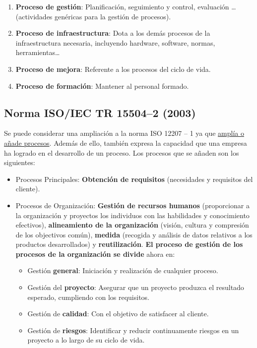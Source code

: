 \begin{enumerate}
    \item \textbf{Proceso de gestión}: Planificación, seguimiento y control, evaluación \ldots (actividades genéricas para la gestión de procesos).
    \item \textbf{Proceso de infraestructura}: Dota a los demás procesos de la infraestructura necesaria, incluyendo hardware, software, normas, herramientas\ldots
    \item \textbf{Proceso de mejora}: Referente a los procesos del ciclo de vida.
    \item \textbf{Proceso de formación}: Mantener al personal formado.
\end{enumerate}

\subsection{Norma ISO/IEC TR 15504--2 (2003)}
Se puede considerar una ampliación a la norma ISO 12207 – 1 ya que \uline{amplía o añade procesos}. Además de ello, también expresa la capacidad que una empresa ha logrado en el desarrollo de un proceso. Los procesos que se añaden son los siguientes:


\begin{itemize}
    \item Procesos Principales: \textbf{Obtención de requisitos} (necesidades y requisitos del cliente).
    \item Procesos de Organización: \textbf{Gestión de recursos humanos} (proporcionar a la organización y proyectos los individuos con las habilidades y conocimiento efectivos), \textbf{alineamiento de la organización} (visión, cultura y compresión de los objectivos común), \textbf{medida} (recogida y análisis de datos relativos a los productos desarrollados) y \textbf{reutilización}. \textbf{El proceso de gestión de los procesos de la organización se divide} ahora en:
          \begin{itemize}
              \item Gestión \textbf{general}: Iniciación y realización de cualquier proceso.
              \item Gestión del \textbf{proyecto}: Asegurar que un proyecto produzca el resultado esperado, cumpliendo con los requisitos.
              \item Gestión de \textbf{calidad}: Con el objetivo de satisfacer al cliente.
              \item Gestión de \textbf{riesgos}: Identificar y reducir continuamente riesgos en un proyecto a lo largo de su ciclo de vida.
          \end{itemize}
\end{itemize}


